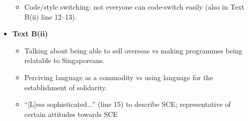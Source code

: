 \documentclass[../main.tex]{subfiles}
\begin{document}
\begin{itemize}
\begin{itemize}
                \item Code/style switching: not everyone can code-switch easily (also in Text B(ii) line 12--13).
            \end{itemize}
            \item \textbf{Text B(ii)} \begin{itemize}
                \item Talking about being able to sell overseas vs making programmes being relatable to Singaporeans.
                \item Perciving language as a commodity vs using language for the establishment of solidarity.
                \item ``[L]ess sophisticated...'' (line 15) to describe SCE; representative of certain attitudes towards SCE
            \end{itemize}
        \end{itemize}
\end{document}
